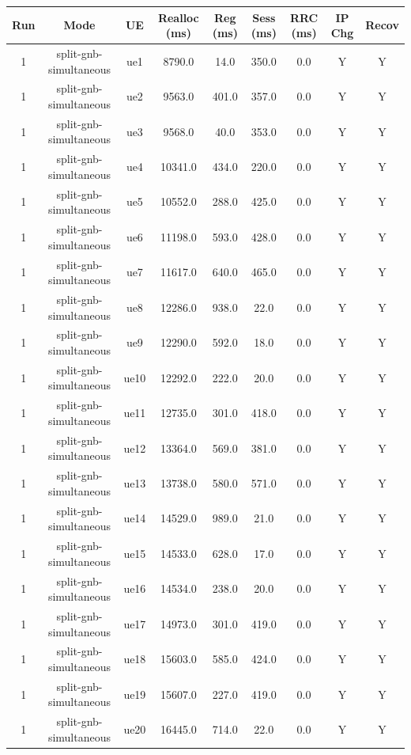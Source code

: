 \begin{table}[ht]
\centering
\begin{tabular}{|c|c|c|c|c|c|c|c|c|}
\hline
Run & Mode & UE & Realloc (ms) & Reg (ms) & Sess (ms) & RRC (ms) & IP Chg & Recov \\
\hline
1 & split-gnb-simultaneous & ue1 & 8790.0 & 14.0 & 350.0 & 0.0 & Y & Y \\
1 & split-gnb-simultaneous & ue2 & 9563.0 & 401.0 & 357.0 & 0.0 & Y & Y \\
1 & split-gnb-simultaneous & ue3 & 9568.0 & 40.0 & 353.0 & 0.0 & Y & Y \\
1 & split-gnb-simultaneous & ue4 & 10341.0 & 434.0 & 220.0 & 0.0 & Y & Y \\
1 & split-gnb-simultaneous & ue5 & 10552.0 & 288.0 & 425.0 & 0.0 & Y & Y \\
1 & split-gnb-simultaneous & ue6 & 11198.0 & 593.0 & 428.0 & 0.0 & Y & Y \\
1 & split-gnb-simultaneous & ue7 & 11617.0 & 640.0 & 465.0 & 0.0 & Y & Y \\
1 & split-gnb-simultaneous & ue8 & 12286.0 & 938.0 & 22.0 & 0.0 & Y & Y \\
1 & split-gnb-simultaneous & ue9 & 12290.0 & 592.0 & 18.0 & 0.0 & Y & Y \\
1 & split-gnb-simultaneous & ue10 & 12292.0 & 222.0 & 20.0 & 0.0 & Y & Y \\
1 & split-gnb-simultaneous & ue11 & 12735.0 & 301.0 & 418.0 & 0.0 & Y & Y \\
1 & split-gnb-simultaneous & ue12 & 13364.0 & 569.0 & 381.0 & 0.0 & Y & Y \\
1 & split-gnb-simultaneous & ue13 & 13738.0 & 580.0 & 571.0 & 0.0 & Y & Y \\
1 & split-gnb-simultaneous & ue14 & 14529.0 & 989.0 & 21.0 & 0.0 & Y & Y \\
1 & split-gnb-simultaneous & ue15 & 14533.0 & 628.0 & 17.0 & 0.0 & Y & Y \\
1 & split-gnb-simultaneous & ue16 & 14534.0 & 238.0 & 20.0 & 0.0 & Y & Y \\
1 & split-gnb-simultaneous & ue17 & 14973.0 & 301.0 & 419.0 & 0.0 & Y & Y \\
1 & split-gnb-simultaneous & ue18 & 15603.0 & 585.0 & 424.0 & 0.0 & Y & Y \\
1 & split-gnb-simultaneous & ue19 & 15607.0 & 227.0 & 419.0 & 0.0 & Y & Y \\
1 & split-gnb-simultaneous & ue20 & 16445.0 & 714.0 & 22.0 & 0.0 & Y & Y \\

\end{tabular}
\end{table}
